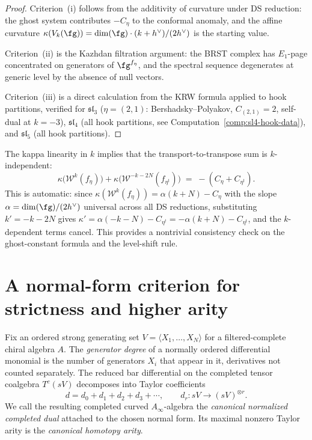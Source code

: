 \begin{proof}
Criterion~(i) follows from the additivity of curvature under DS
reduction: the ghost system contributes $-C_\eta$ to the
conformal anomaly, and the affine curvature
$\kappa(V_k(\fg)) = \dim(\fg) \cdot (k + h^\vee)/(2h^\vee)$
is the starting value.

Criterion~(ii) is the Kazhdan filtration argument: the BRST
complex has $E_1$-page concentrated on generators of
$\fg^{f_\eta}$, and the spectral sequence degenerates at generic
level by the absence of null vectors.

Criterion~(iii) is a direct calculation from the KRW formula
applied to hook partitions, verified for
$\mathfrak{sl}_3$ ($\eta = (2,1)$: Bershadsky--Polyakov,
$C_{(2,1)} = 2$, self-dual at $k = -3$),
$\mathfrak{sl}_4$ (all hook partitions, see
Computation~\ref{comp:sl4-hook-data}), and
$\mathfrak{sl}_5$ (all hook partitions).
\end{proof}

\begin{remark}
\label{rem:hook-kappa-sum-rule}
The kappa linearity in $k$ implies that the transport-to-transpose
sum is $k$-independent:
\[
\kappa\bigl(\mathcal{W}^k(f_\eta)\bigr)
+ \kappa\bigl(\mathcal{W}^{-k-2N}(f_{\eta^t})\bigr)
\;=\; -(C_\eta + C_{\eta^t}).
\]
This is automatic: since
$\kappa(\mathcal{W}^k(f_\eta)) = \alpha(k + N) - C_\eta$
with the slope $\alpha = \dim(\fg)/(2h^\vee)$ universal across all
DS reductions, substituting $k' = -k - 2N$ gives
$\kappa' = \alpha(-k - N) - C_{\eta^t} = -\alpha(k+N) - C_{\eta^t}$,
and the $k$-dependent terms cancel.  This provides a nontrivial
consistency check on the ghost-constant formula and the
level-shift rule.
\end{remark}

\section{A normal-form criterion for strictness and higher arity}

\begin{definition}
Fix an ordered strong generating set $V=\langle X_1,\dots,X_N\rangle$ for a
filtered-complete chiral algebra $A$.  The \emph{generator degree} of a
normally ordered differential monomial is the number of generators $X_i$ that
appear in it, derivatives not counted separately.  The reduced bar differential
on the completed tensor coalgebra $T^c(sV)$ decomposes into Taylor coefficients
\[
d = d_0 + d_1 + d_2 + d_3 + \cdots,
\qquad
d_r: sV \longrightarrow (sV)^{\otimes r}.
\]
We call the resulting completed curved $A_\infty$-algebra the
\emph{canonical normalized completed dual} attached to the chosen normal form.
Its maximal nonzero Taylor arity is the \emph{canonical homotopy arity}.
\end{definition}

